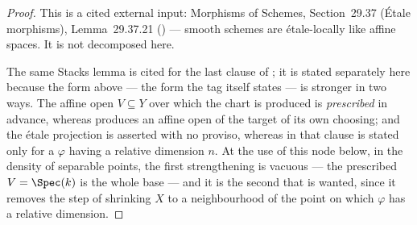\begin{proof}
This is a cited external input: Morphisms of Schemes, Section~29.37
(\'Etale morphisms), Lemma~29.37.21
() --- smooth schemes are
\'etale-locally like affine spaces.  It is not decomposed here.

The same Stacks lemma is cited for the last clause of
; it is stated separately here because
the form above --- the form the tag itself states --- is stronger in two
ways.  The affine open $V\subseteq Y$ over which the chart is produced
is \emph{prescribed} in advance, whereas 
produces an affine open of the target of its own choosing; and the
\'etale projection is asserted with no proviso, whereas in
 that clause is stated only for a
$\varphi$ having a relative dimension $n$.  At the use of this node
below, in the density of separable points, the first strengthening is
vacuous --- the prescribed $V=\Spec(k)$ is the whole base --- and it is
the second that is wanted, since it removes the step of shrinking $X$ to
a neighbourhood of the point on which $\varphi$ has a relative
dimension.
\end{proof}

